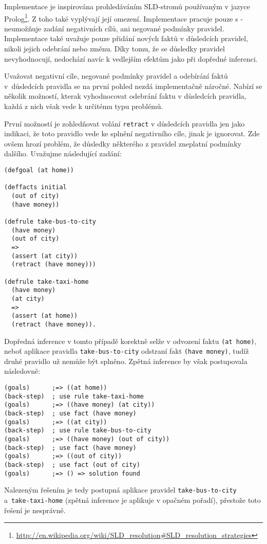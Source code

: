 Implementace je inspirována prohledáváním SLD-stromů používaným v jazyce
Prolog\footnote{\url{http://en.wikipedia.org/wiki/SLD\_resolution\#SLD\_resolution\_strategies}}.
Z toho také vyplývají její omezení. Implementace pracuje pouze s  - neumožňuje zadání negativních cílů, ani negované podmínky pravidel.
Implementace také uvažuje pouze přidání nových faktů v důsledcích pravidel,
nikoli jejich odebrání nebo změnu. Díky tomu, že se důsledky pravidel
nevyhodnocují, nedochází navíc k vedlejším efektům jako při dopředné inferenci.

Uvažovat negativní cíle, negované podmínky pravidel a odebírání faktů
v~důsledcích pravidla se na první pohled nezdá implementačně náročné. Nabízí se
několik možností, kterak vyhodnocovat odebrání faktu v důsledcích pravidla,
každá z nich však vede k určitému typu problémů.

První možností je zohledňovat volání \verb|retract| v důsledcích pravidla jen
jako indikaci, že toto pravidlo vede ke splnění negativního cíle, jinak je
ignorovat. Zde ovšem hrozí problém, že důsledky některého z pravidel zneplatní
podmínky dalšího. Uvažujme následující zadání:
\begin{verbatim}
(defgoal (at home))

(deffacts initial
  (out of city)
  (have money))

(defrule take-bus-to-city
  (have money)
  (out of city)
  =>
  (assert (at city))
  (retract (have money)))

(defrule take-taxi-home
  (have money)
  (at city)
  =>
  (assert (at home))
  (retract (have money)).
\end{verbatim}
Dopředná inference v tomto případě korektně selže v odvození faktu
\verb|(at home)|, neboť aplikace pravidla \verb|take-bus-to-city| odstraní fakt
\verb|(have money)|, tudíž druhé pravidlo už nemůže být splněno. Zpětná
inference by však postupovala následovně:
\begin{verbatim}
(goals)      ;=> ((at home))
(back-step)  ; use rule take-taxi-home
(goals)      ;=> ((have money) (at city))
(back-step)  ; use fact (have money)
(goals)      ;=> ((at city))
(back-step)  ; use rule take-bus-to-city
(goals)      ;=> ((have money) (out of city))
(back-step)  ; use fact (have money)
(goals)      ;=> ((out of city))
(back-step)  ; use fact (out of city)
(goals)      ;=> () => solution found
\end{verbatim}
Nalezeným řešením je tedy postupná aplikace pravidel \verb|take-bus-to-city|
a~\verb|take-taxi-home| (zpětná inference je aplikuje v opačném pořadí),
přestože toto řešení je nesprávné.

